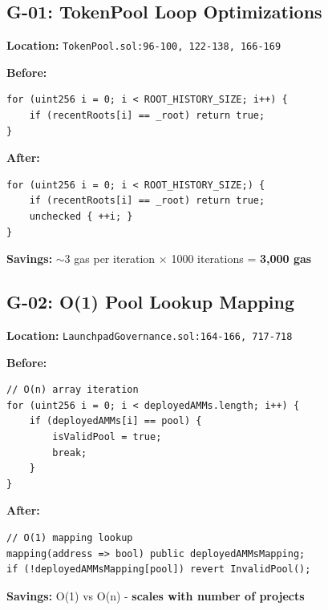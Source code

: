 \documentclass[11pt,a4paper]{article}
\begin{document}
\vspace{1em}

\begin{gasbox}
\subsection{G-01: TokenPool Loop Optimizations}
\end{gasbox}

\textbf{Location:} \texttt{TokenPool.sol:96-100, 122-138, 166-169}

\textbf{Before:}
\begin{lstlisting}
for (uint256 i = 0; i < ROOT_HISTORY_SIZE; i++) {
    if (recentRoots[i] == _root) return true;
}
\end{lstlisting}

\textbf{After:}
\begin{lstlisting}
for (uint256 i = 0; i < ROOT_HISTORY_SIZE;) {
    if (recentRoots[i] == _root) return true;
    unchecked { ++i; }
}
\end{lstlisting}

\textbf{Savings:} $\sim$3 gas per iteration $\times$ 1000 iterations = \textbf{3,000 gas}

\vspace{1em}

\begin{gasbox}
\subsection{G-02: O(1) Pool Lookup Mapping}
\end{gasbox}

\textbf{Location:} \texttt{LaunchpadGovernance.sol:164-166, 717-718}

\textbf{Before:}
\begin{lstlisting}
// O(n) array iteration
for (uint256 i = 0; i < deployedAMMs.length; i++) {
    if (deployedAMMs[i] == pool) {
        isValidPool = true;
        break;
    }
}
\end{lstlisting}

\textbf{After:}
\begin{lstlisting}
// O(1) mapping lookup
mapping(address => bool) public deployedAMMsMapping;
if (!deployedAMMsMapping[pool]) revert InvalidPool();
\end{lstlisting}

\textbf{Savings:} O(1) vs O(n) - \textbf{scales with number of projects}

\vspace{1em}
\end{document}
